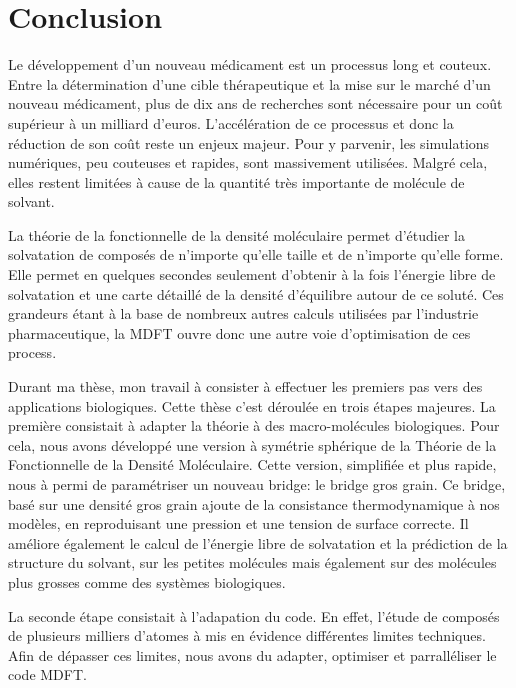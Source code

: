 \chapter{Conclusion}
\label{chap:conclusion}
Le développement d'un nouveau médicament est un processus long et couteux. Entre la détermination d'une cible thérapeutique et la mise sur le marché d'un nouveau médicament, plus de dix ans de recherches sont nécessaire pour un coût supérieur à un milliard d'euros.
L'accélération de ce processus et donc la réduction de son coût reste un enjeux majeur. Pour y parvenir, les simulations numériques, peu couteuses et rapides, sont massivement utilisées. Malgré cela, elles restent limitées à cause de la quantité très importante de molécule de solvant.


La théorie de la fonctionnelle de la densité moléculaire permet d'étudier la solvatation de composés de n'importe qu'elle taille et de n'importe qu'elle forme. Elle permet en quelques secondes seulement d'obtenir à la fois l'énergie libre de solvatation et une carte détaillé de la densité d'équilibre autour de ce soluté.
Ces grandeurs étant à la base de nombreux autres calculs utilisées par l'industrie pharmaceutique, la MDFT ouvre donc une autre voie d'optimisation de ces process.


Durant ma thèse, mon travail à consister à effectuer les premiers pas vers des applications biologiques. Cette thèse c'est déroulée en trois étapes majeures. La première consistait à adapter la théorie à des macro-molécules biologiques. Pour cela, nous avons développé une version à symétrie sphérique de la Théorie de la Fonctionnelle de la Densité Moléculaire. Cette version, simplifiée et plus rapide, nous à permi de paramétriser un nouveau bridge: le bridge gros grain.
Ce bridge, basé sur une densité gros grain ajoute de la consistance thermodynamique à nos modèles, en reproduisant une pression et une tension de surface correcte. Il améliore également le calcul de l’énergie libre de solvatation et la prédiction de la structure du solvant, sur les petites molécules mais également sur des molécules plus grosses comme des systèmes biologiques.


La seconde étape consistait à l'adapation du code. En effet, l'étude de composés de plusieurs milliers d'atomes à mis en évidence différentes limites techniques. Afin de dépasser ces limites, nous avons du adapter, optimiser et parralléliser le code MDFT.


